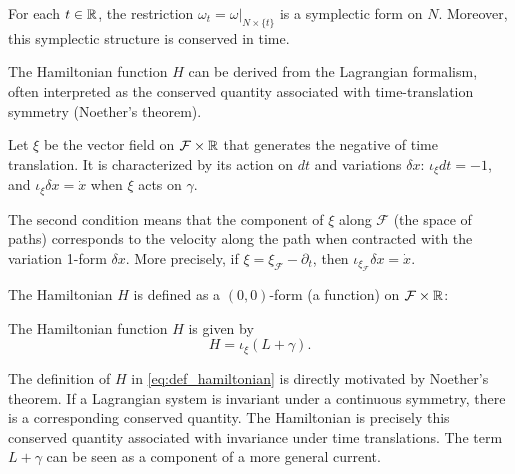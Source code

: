 \begin{corollary}
\label{cor:omega_symplectic}
For each $t \in \mathbb{R}$, the restriction $\omega_t = \omega|_{N \times \{t\}}$ is a symplectic form on $N$. Moreover, this symplectic structure is conserved in time.
\end{corollary}

The Hamiltonian function $H$ can be derived from the Lagrangian formalism, often interpreted as the conserved quantity associated with time-translation symmetry (Noether's theorem).

Let $\xi$ be the vector field on $\mathcal{F} \times \mathbb{R}$ that generates the negative of time translation. It is characterized by its action on $dt$ and variations $\delta x$: $\iota_{\xi}dt = -1$, and $\iota_{\xi}\delta x = \dot{x}$ when $\xi$ acts on $\gamma$.

The second condition means that the component of $\xi$ along $\mathcal{F}$ (the space of paths) corresponds to the velocity along the path when contracted with the variation 1-form $\delta x$. More precisely, if $\xi = \xi_{\mathcal{F}} - \partial_t$, then $\iota_{\xi_{\mathcal{F}}}\delta x = \dot{x}$.

The Hamiltonian $H$ is defined as a $(0,0)$-form (a function) on $\mathcal{F} \times \mathbb{R}$:
\begin{definition}
The Hamiltonian function $H$ is given by
\begin{equation}
\label{eq:def_hamiltonian}
    H = \iota_{\xi}(L+\gamma).
\end{equation}
\end{definition}

\begin{remark}
\label{rem:noether_hamiltonian}
The definition of $H$ in \eqref{eq:def_hamiltonian} is directly motivated by Noether's theorem. If a Lagrangian system is invariant under a continuous symmetry, there is a corresponding conserved quantity. The Hamiltonian is precisely this conserved quantity associated with invariance under time translations. The term $L+\gamma$ can be seen as a component of a more general current.
\end{remark}

